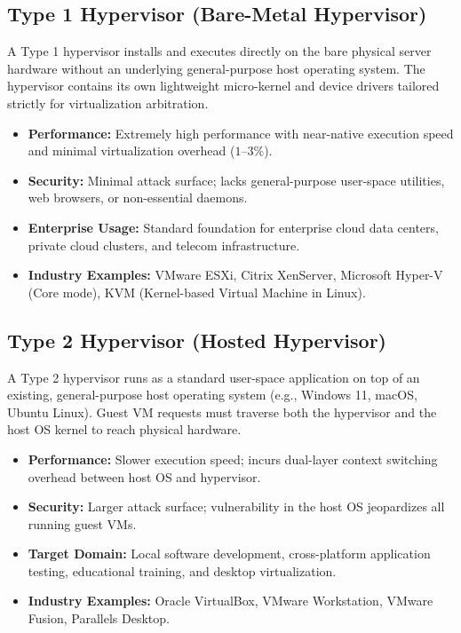 \subsection{Type 1 Hypervisor (Bare-Metal Hypervisor)}
A Type 1 hypervisor installs and executes directly on the bare physical server hardware without an underlying general-purpose host operating system. The hypervisor contains its own lightweight micro-kernel and device drivers tailored strictly for virtualization arbitration.
\begin{itemize}
    \item \textbf{Performance:} Extremely high performance with near-native execution speed and minimal virtualization overhead ($1\text{--}3\%$).
    \item \textbf{Security:} Minimal attack surface; lacks general-purpose user-space utilities, web browsers, or non-essential daemons.
    \item \textbf{Enterprise Usage:} Standard foundation for enterprise cloud data centers, private cloud clusters, and telecom infrastructure.
    \item \textbf{Industry Examples:} VMware ESXi, Citrix XenServer, Microsoft Hyper-V (Core mode), KVM (Kernel-based Virtual Machine in Linux).
\end{itemize}

\subsection{Type 2 Hypervisor (Hosted Hypervisor)}
A Type 2 hypervisor runs as a standard user-space application on top of an existing, general-purpose host operating system (e.g., Windows 11, macOS, Ubuntu Linux). Guest VM requests must traverse both the hypervisor and the host OS kernel to reach physical hardware.
\begin{itemize}
    \item \textbf{Performance:} Slower execution speed; incurs dual-layer context switching overhead between host OS and hypervisor.
    \item \textbf{Security:} Larger attack surface; vulnerability in the host OS jeopardizes all running guest VMs.
    \item \textbf{Target Domain:} Local software development, cross-platform application testing, educational training, and desktop virtualization.
    \item \textbf{Industry Examples:} Oracle VirtualBox, VMware Workstation, VMware Fusion, Parallels Desktop.
\end{itemize}

